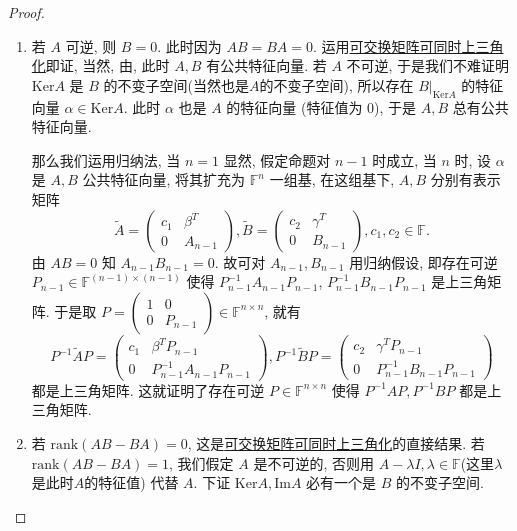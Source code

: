 \documentclass[../../main.tex]{subfiles}
\begin{document}
\begin{proof}
\begin{enumerate}
\item 若 \( A \) 可逆, 则 \( B = 0 \). 此时因为 \( AB = BA = 0 \). 运用\hyperref[proposition:一族两两可交换的一般域上的矩阵可同时上三角化]{可交换矩阵可同时上三角化}即证, 当然, 由, 此时 \( A, B \) 有公共特征向量. 若 \( A \) 不可逆, 于是我们不难证明 \( \mathrm{Ker} A \) 是 \( B \) 的不变子空间(当然也是$A$的不变子空间), 所以存在 \( B|_{\mathrm{Ker} A} \) 的特征向量 \( \alpha \in \mathrm{Ker} A \). 此时 \( \alpha \) 也是 \( A \) 的特征向量 (特征值为 0), 于是 \( A, B \) 总有公共特征向量.

那么我们运用归纳法, 当 \( n = 1 \) 显然, 假定命题对 \( n - 1 \) 时成立, 当 \( n \) 时, 设 \( \alpha \) 是 \( A, B \) 公共特征向量, 将其扩充为 \( \mathbb{F}^n \) 一组基, 在这组基下, \( A, B \) 分别有表示矩阵
\[
\widetilde{A} = \begin{pmatrix} c_1 & \beta^T \\ 0 & A_{n - 1} \end{pmatrix}, \widetilde{B} = \begin{pmatrix} c_2 & \gamma^T \\ 0 & B_{n - 1} \end{pmatrix}, c_1, c_2 \in \mathbb{F}.
\]
由 \( AB = 0 \) 知 \( A_{n - 1}B_{n - 1} = 0 \). 故可对 \( A_{n - 1}, B_{n - 1} \) 用归纳假设, 即存在可逆 \( P_{n - 1} \in \mathbb{F}^{(n - 1) \times (n - 1)} \) 使得 $P_{n - 1}^{-1}A_{n - 1}P_{n - 1}$, $P_{n - 1}^{-1}$$B_{n - 1}$$P_{n - 1}$ 是上三角矩阵. 于是取 \( P = \begin{pmatrix} 1 & 0 \\ 0 & P_{n - 1} \end{pmatrix} \in \mathbb{F}^{n \times n} \), 就有
\[
P^{-1}\widetilde{A}P = \begin{pmatrix} c_1 & \beta^T P_{n - 1} \\ 0 & P_{n - 1}^{-1}A_{n - 1}P_{n - 1} \end{pmatrix}, P^{-1}\widetilde{B}P = \begin{pmatrix} c_2 & \gamma^T P_{n - 1} \\ 0 & P_{n - 1}^{-1}B_{n - 1}P_{n - 1} \end{pmatrix}
\]
都是上三角矩阵. 这就证明了存在可逆 \( P \in \mathbb{F}^{n \times n} \) 使得 \( P^{-1}AP, P^{-1}BP \) 都是上三角矩阵.

\item 若 \( \mathrm{rank}(AB - BA) = 0 \), 这是\hyperref[proposition:一族两两可交换的一般域上的矩阵可同时上三角化]{可交换矩阵可同时上三角化}的直接结果. 若 \( \mathrm{rank}(AB - BA) = 1 \), 我们假定 \( A \) 是不可逆的, 否则用 \( A - \lambda I, \lambda \in \mathbb{F} \)(这里$\lambda$是此时$A$的特征值) 代替 \( A \). 下证 \( \mathrm{Ker} A, \mathrm{Im} A \) 必有一个是 \( B \) 的不变子空间.


\end{enumerate}
\end{proof}
\end{document}

